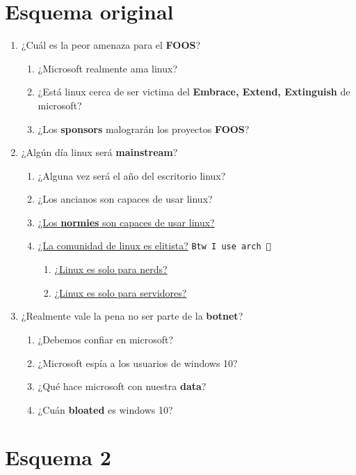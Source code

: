 \documentclass[12pt, twoside]{article}
\begin{document}
\section{Esquema original}%
\label{sec:Esquema original}

\begin{enumerate}
	\item ¿Cuál es la peor amenaza para el \textbf{FOOS}?
		\begin{enumerate}
			\item ¿Microsoft realmente ama linux?
			\item ¿Está linux cerca de ser victima del \textbf{Embrace, Extend, Extinguish} de microsoft?
			\item ¿Los \textbf{sponsors} malograrán los proyectos \textbf{FOOS}?
		\end{enumerate}
	\item ¿Algún día linux será \textbf{mainstream}?
		\begin{enumerate}
			\item ¿Alguna vez será el año del escritorio linux?
			\item ¿Los ancianos son capaces de usar linux?
			\item \underline{¿Los \textbf{normies} son capaces de usar linux?}
			\item \underline{¿La comunidad de linux es elitista?}
				{\tiny\color{arch}\texttt{Btw I use arch  }}
				\begin{enumerate}
					\item \underline{¿Linux es solo para nerds?}
					\item \underline{¿Linux es solo para servidores?}
				\end{enumerate}
		\end{enumerate}
	\item ¿Realmente vale la pena no ser parte de la \textbf{botnet}?
		\begin{enumerate}
			\item ¿Debemos confiar en microsoft?
			\item ¿Microsoft espía a los usuarios de windows 10?
			\item ¿Qué hace microsoft con nuestra \textbf{data}?
			\item ¿Cuán \textbf{bloated} es windows 10?
		\end{enumerate}
\end{enumerate}
\section{Esquema 2}%
\label{sec:Esquema 2}
\end{document}
